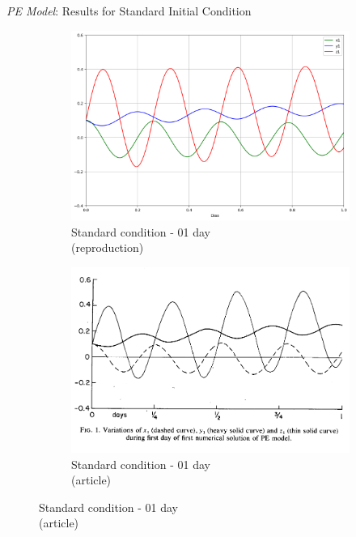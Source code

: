 \begin{frame}{\textit{PE Model}: Results for Standard Initial Condition}
	\begin{figure}
		\centering
		\begin{subfigure}[b]{0.45\textwidth}
			\centering
			\includegraphics[width=\textwidth]{img/p01d01.png}
			\caption{Standard condition - 01 day\\(reproduction)}
			\label{fig:p01d01}
		\end{subfigure}
		\hfill
		\begin{subfigure}[b]{0.45\textwidth}
			\centering
			\includegraphics[width=\textwidth]{img/p01d01rel.png}
			\caption{Standard condition - 01 day\\(article)}
			\label{fig:p01d01rel}
		\end{subfigure}
	\end{figure}
\end{frame}

